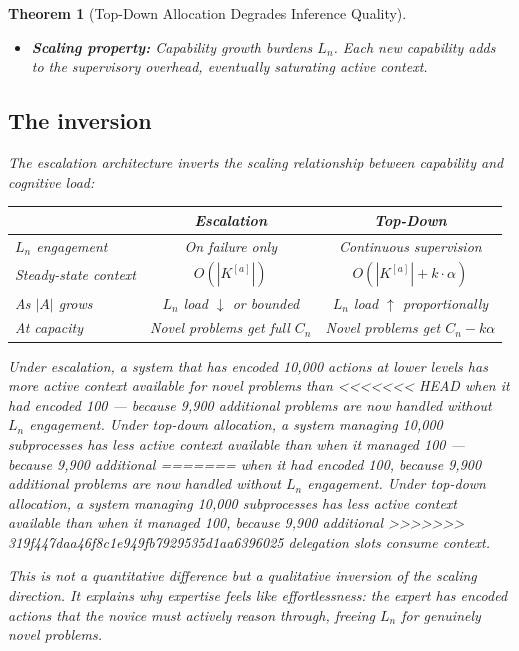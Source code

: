 \documentclass[11pt]{article}
\newtheorem{theorem}{Theorem}
\theoremstyle{definition}
\begin{document}
\begin{theorem}[Top-Down Allocation Degrades Inference Quality]
\begin{itemize}
\item \textbf{Scaling property:} Capability growth \emph{burdens}
   $L_n$. Each new capability adds to the supervisory overhead,
   eventually saturating active context.
\end{itemize}

\subsection{The inversion}

The escalation architecture inverts the scaling relationship between
capability and cognitive load:

\begin{center}
\begin{tabular}{@{}lcc@{}}
\toprule
& \textbf{Escalation} & \textbf{Top-Down} \\
\midrule
$L_n$ engagement & On failure only & Continuous supervision \\
Steady-state context & $O(|K^{[a]}|)$ & $O(|K^{[a]}| + k \cdot
\alpha)$ \\
As $|A|$ grows & $L_n$ load $\downarrow$ or bounded &
$L_n$ load $\uparrow$ proportionally \\
At capacity & Novel problems get full $C_n$ &
Novel problems get $C_n - k\alpha$ \\
\bottomrule
\end{tabular}
\end{center}

Under escalation, a system that has encoded 10{,}000 actions at lower
levels has \emph{more} active context available for novel problems than
<<<<<<< HEAD
when it had encoded 100 --- because 9{,}900 additional problems are
now handled without $L_n$ engagement. Under top-down allocation, a
system managing 10{,}000 subprocesses has \emph{less} active context
available than when it managed 100 --- because 9{,}900 additional
=======
when it had encoded 100, because 9{,}900 additional problems are
now handled without $L_n$ engagement. Under top-down allocation, a
system managing 10{,}000 subprocesses has \emph{less} active context
available than when it managed 100, because 9{,}900 additional
>>>>>>> 319f447daa46f8c1e949fb7929535d1aa6396025
delegation slots consume context.

This is not a quantitative difference but a qualitative inversion of
the scaling direction. It explains why expertise feels like
\emph{effortlessness}: the expert has encoded actions that the novice
must actively reason through, freeing $L_n$ for genuinely novel
problems.


\end{theorem}
\end{document}
